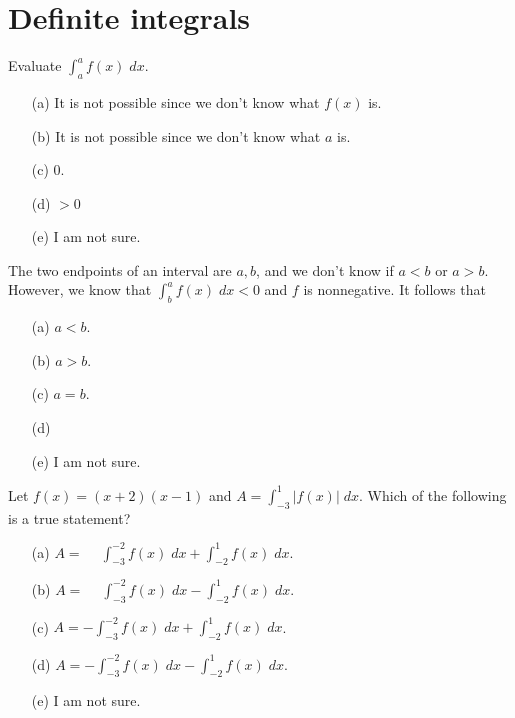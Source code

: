\documentclass[14pt]{beamer}
\begin{document}
\section{Definite integrals}

\begin{frame}
  Evaluate \(\int_{a}^{a} f(x) \;dx\). 

  \begin{itemize} \setlength\itemsep{1ex}
    \item[(a)] It is not possible since we don't know what \(f(x)\) is.
    \item[(b)] It is not possible since we don't know what \(a\) is.
    \item[(c)] \(0\).
    \item[(d)] \(> 0\)
    \item[(e)] I am not sure.
  \end{itemize}
\end{frame}

\begin{frame}[t]
  The two endpoints of an interval are \(a,b\), and we don't know if \(a < b\) or \(a > b\). However, we know that \(\int_{b}^{a} f(x) \;dx < 0\) and \(f\) is nonnegative. It follows that 

  \begin{itemize} \setlength\itemsep{1ex}
    \item[(a)] \(a < b\).
    \item[(b)] \(a > b\).
    \item[(c)] \(a = b\).
    \item[(d)] 
    \item[(e)] I am not sure.
  \end{itemize} 
\end{frame}

\begin{frame}[t]
  Let \(f(x) = (x+2)(x-1)\) and \(A = \int_{-3}^{1} \big|f(x)\big| \;dx\).  Which of the following is a true statement?

  \begin{itemize} \setlength\itemsep{1ex}
    \item[(a)] \(A = \phantom{-}\int_{-3}^{-2} f(x) \;dx + \int_{-2}^{1} f(x) \;dx\).
    \item[(b)] \(A = \phantom{-}\int_{-3}^{-2} f(x) \;dx - \int_{-2}^{1} f(x) \;dx\).
    \item[(c)] \(A = -\int_{-3}^{-2} f(x) \;dx + \int_{-2}^{1} f(x) \;dx\).
    \item[(d)] \(A = -\int_{-3}^{-2} f(x) \;dx - \int_{-2}^{1} f(x) \;dx\).
    \item[(e)] I am not sure.
  \end{itemize} 
\end{frame}
\end{document}
